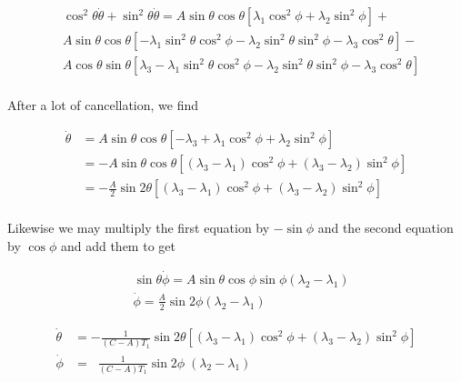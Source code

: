 \documentclass[extra,mreferee]{gji}
\begin{document}
\begin{equation}
\begin{aligned}
 & \cos^2{\theta}\dot{\theta} + \sin^2{\theta} \dot{\theta} =  
   A \sin{\theta} \cos{\theta} \left[ \lambda_1 \cos^2{\phi} +  \lambda_2 \sin^2{\phi} \right] + \\
  &A \sin{\theta} \cos{\theta} \left[ - \lambda_1 \sin^2{\theta}\cos^2{\phi} - \lambda_2 \sin^2{\theta}\sin^2{\phi} - \lambda_3 \cos^2{\theta} \right] - \\
  &A \cos{\theta} \sin{\theta} \left[ \lambda_3 - \lambda_1 \sin^2{\theta}\cos^2{\phi} - \lambda_2 \sin^2{\theta}\sin^2{\phi} - \lambda_3 \cos^2{\theta} \right] \\
\end{aligned}
\end{equation}

After a lot of cancellation, we find

\begin{equation}
\begin{aligned}
 \dot{\theta} &= A \sin{\theta} \cos{\theta} \left[ - \lambda_3 + \lambda_1 \cos^2{\phi} + \lambda_2 \sin^2{\phi} \right] \\
              &= - A \sin{\theta} \cos{\theta} \left[ (\lambda_3 - \lambda_1) \cos^2{\phi} + (\lambda_3 - \lambda_2) \sin^2{\phi} \right] \\
              &= -\frac{A}{2} \sin{2 \theta} \left[ (\lambda_3 - \lambda_1) \cos^2{\phi} + (\lambda_3 - \lambda_2) \sin^2{\phi} \right] \\
\end{aligned}
\end{equation}

Likewise we may multiply the first equation by $-\sin{\phi}$ and the second equation by $\cos{\phi}$ and add them to get

\begin{equation}
\begin{aligned}
 & \sin{\theta} \dot{\phi} = A \sin{\theta}\cos{\phi}\sin{\phi} \left( \lambda_2 - \lambda_1 \right ) \\
& \dot{\phi} = \frac{A}{2} \sin{2 \phi} (\lambda_2-\lambda_1)
\end{aligned}
\end{equation}

\else
\fi


\begin{equation}
\begin{aligned}
\dot{\theta} &= - \frac{1}{(C-A)T_1} \sin{2 \theta} \left[ (\lambda_3-\lambda_1) \cos^2{\phi} + (\lambda_3-\lambda_2) \sin^2{\phi} \right] \\
\dot{\phi} &= \;\; \frac{1}{(C-A)T_1} \sin{2 \phi} \; (\lambda_2 - \lambda_1)
\end{aligned}
\label{milankovitch}
\end{equation}
\end{document}
